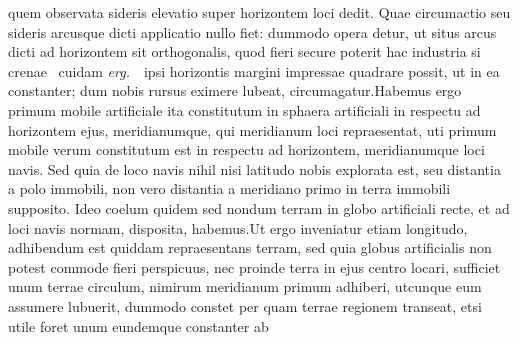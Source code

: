 quem observata sideris\protect{} elevatio super horizontem loci dedit. Quae circumactio seu sideris arcusque\protect{} dicti applicatio nullo  fiet: dummodo opera detur, ut situs arcus dicti ad horizontem sit orthogonalis, quod fieri secure poterit hac industria si crenae  \textbar\ cuidam \textit{ erg.}\ \textbar\  ipsi horizontis margini impressae quadrare possit, ut in ea constanter; dum nobis rursus eximere lubeat, circumagatur.\pend \pstart Habemus ergo primum mobile artificiale ita constitutum in sphaera artificiali in respectu ad horizontem ejus, meridianumque\protect{}, qui meridianum\protect{} loci repraesentat, uti primum mobile verum constitutum est in respectu ad horizontem, meridianumque\protect{} loci navis\protect{}. Sed quia de loco navis\protect{} nihil nisi latitudo\protect{} nobis explorata est, seu distantia a polo\protect{} immobili, non vero distantia a meridiano\protect{} primo in terra immobili supposito. Ideo coelum quidem sed nondum terram in globo artificiali\protect{} recte, et ad loci navis\protect{} normam, disposita, habemus.\pend \pstart Ut ergo inveniatur etiam longitudo\protect{}, adhibendum est quiddam repraesentans terram, sed quia globus artificialis\protect{} non potest commode fieri perspicuus, nec proinde terra in ejus centro locari, sufficiet unum terrae circulum, nimirum meridianum\protect{} primum adhiberi, utcunque eum assumere lubuerit, dummodo constet per quam terrae regionem transeat, etsi utile foret unum eundemque constanter ab 